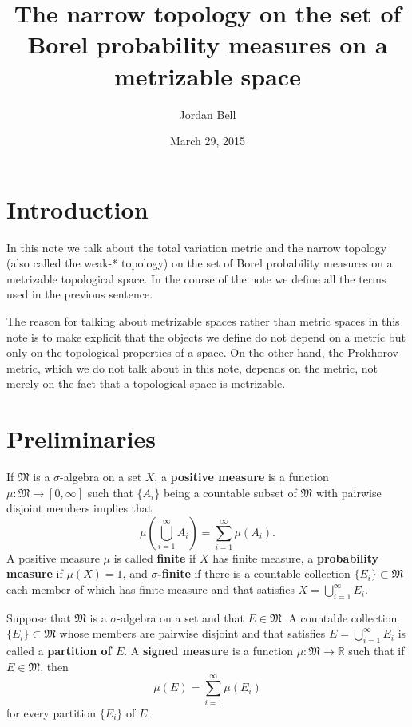 \documentclass{article}
\theoremstyle{definition}
\begin{document}
\title{The narrow topology on the set of Borel probability measures on a metrizable space}
\author{Jordan Bell}
\date{March 29, 2015}

\maketitle

\section{Introduction}
In this note we talk about the total variation metric and the narrow topology (also called the weak-* topology) on the set of Borel probability measures on a metrizable topological space.
In the course of the note we define all the terms used in the previous sentence. 

The reason for talking about metrizable spaces rather than metric spaces in this note is to make explicit that the objects we define do not depend on a metric but only on the topological
properties of a space. On the other hand, the Prokhorov metric, which we do not talk about in this note, depends on the metric, not merely on the fact
that a topological space is metrizable.

\section{Preliminaries}
If $\mathfrak{M}$ is a $\sigma$-algebra on a set $X$, a \textbf{positive measure} is a function
$\mu:\mathfrak{M} \to [0,\infty]$ such that $\{A_i\}$ being a countable subset of $\mathfrak{M}$ with pairwise disjoint
members implies that 
\[
\mu\left( \bigcup_{i=1}^\infty A_i\right) = \sum_{i=1}^\infty \mu(A_i).
\]
A positive measure $\mu$ is called \textbf{finite} if $X$ has finite measure, a \textbf{probability measure} if $\mu(X)=1$, and \textbf{$\sigma$-finite}
if there is a countable collection $\{E_i\} \subset \mathfrak{M}$ each member of which has finite measure and that satisfies  $X = \bigcup_{i=1}^\infty E_i$.



Suppose that $\mathfrak{M}$ is a $\sigma$-algebra on a set and that $E \in \mathfrak{M}$. 
A countable collection $\{E_i\} \subset \mathfrak{M}$ whose members are pairwise disjoint and that satisfies $E = \bigcup_{i=1}^\infty E_i$ is called
a \textbf{partition of $E$}. A \textbf{signed measure} is a function $\mu:\mathfrak{M} \to \mathbb{R}$ such that if
$E \in \mathfrak{M}$, then
\begin{equation}
\mu(E) = \sum_{i=1}^\infty \mu(E_i)
\label{unordered}
\end{equation}
for every partition $\{E_i\}$ of $E$. 
\end{document}
